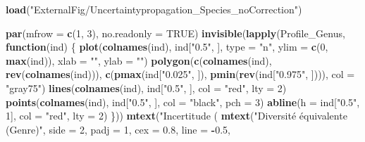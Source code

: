 \documentclass[
  11pt,
  french,
  A4paper,
  extrafontsizes,onecolumn,openright
  ]{memoir}
\newenvironment{Shaded}{\begin{snugshade}}{\end{snugshade}}
\newcommand{\KeywordTok}[1]{\textcolor[rgb]{0.13,0.29,0.53}{\textbf{#1}}}
\newcommand{\DataTypeTok}[1]{\textcolor[rgb]{0.13,0.29,0.53}{#1}}
\newcommand{\DecValTok}[1]{\textcolor[rgb]{0.00,0.00,0.81}{#1}}
\newcommand{\FloatTok}[1]{\textcolor[rgb]{0.00,0.00,0.81}{#1}}
\newcommand{\StringTok}[1]{\textcolor[rgb]{0.31,0.60,0.02}{#1}}
\newcommand{\OtherTok}[1]{\textcolor[rgb]{0.56,0.35,0.01}{#1}}
\newcommand{\ControlFlowTok}[1]{\textcolor[rgb]{0.13,0.29,0.53}{\textbf{#1}}}
\newcommand{\OperatorTok}[1]{\textcolor[rgb]{0.81,0.36,0.00}{\textbf{#1}}}
\newcommand{\NormalTok}[1]{#1}
\begin{document}
\begin{Shaded}
\begin{Highlighting}[]
\KeywordTok{load}\NormalTok{(}\StringTok{"ExternalFig/Uncertaintypropagation_Species_noCorrection"}\NormalTok{)}

\KeywordTok{par}\NormalTok{(}\DataTypeTok{mfrow =} \KeywordTok{c}\NormalTok{(}\DecValTok{1}\NormalTok{, }\DecValTok{3}\NormalTok{), }\DataTypeTok{no.readonly =} \OtherTok{TRUE}\NormalTok{)}
\KeywordTok{invisible}\NormalTok{(}\KeywordTok{lapply}\NormalTok{(Profile_Genus, }\ControlFlowTok{function}\NormalTok{(ind) \{}
    \KeywordTok{plot}\NormalTok{(}\KeywordTok{colnames}\NormalTok{(ind), ind[}\StringTok{"0.5"}\NormalTok{, ], }\DataTypeTok{type =} \StringTok{"n"}\NormalTok{, }\DataTypeTok{ylim =} \KeywordTok{c}\NormalTok{(}\DecValTok{0}\NormalTok{, }\KeywordTok{max}\NormalTok{(ind)), }\DataTypeTok{xlab =} \StringTok{""}\NormalTok{, }
        \DataTypeTok{ylab =} \StringTok{""}\NormalTok{)}
    \KeywordTok{polygon}\NormalTok{(}\KeywordTok{c}\NormalTok{(}\KeywordTok{colnames}\NormalTok{(ind), }\KeywordTok{rev}\NormalTok{(}\KeywordTok{colnames}\NormalTok{(ind))), }\KeywordTok{c}\NormalTok{(}\KeywordTok{pmax}\NormalTok{(ind[}\StringTok{"0.025"}\NormalTok{, ]), }\KeywordTok{pmin}\NormalTok{(}\KeywordTok{rev}\NormalTok{(ind[}\StringTok{"0.975"}\NormalTok{, }
\NormalTok{        ]))), }\DataTypeTok{col =} \StringTok{"gray75"}\NormalTok{)}
    \KeywordTok{lines}\NormalTok{(}\KeywordTok{colnames}\NormalTok{(ind), ind[}\StringTok{"0.5"}\NormalTok{, ], }\DataTypeTok{col =} \StringTok{"red"}\NormalTok{, }\DataTypeTok{lty =} \DecValTok{2}\NormalTok{)}
    \KeywordTok{points}\NormalTok{(}\KeywordTok{colnames}\NormalTok{(ind), ind[}\StringTok{"0.5"}\NormalTok{, ], }\DataTypeTok{col =} \StringTok{"black"}\NormalTok{, }\DataTypeTok{pch =} \DecValTok{3}\NormalTok{)}
    \KeywordTok{abline}\NormalTok{(}\DataTypeTok{h =}\NormalTok{ ind[}\StringTok{"0.5"}\NormalTok{, }\DecValTok{1}\NormalTok{], }\DataTypeTok{col =} \StringTok{"red"}\NormalTok{, }\DataTypeTok{lty =} \DecValTok{2}\NormalTok{)}
\NormalTok{\}))}
\KeywordTok{mtext}\NormalTok{(}\StringTok{"Incertitude (%
\KeywordTok{mtext}\NormalTok{(}\StringTok{"Diversité équivalente (Genre)"}\NormalTok{, }\DataTypeTok{side =} \DecValTok{2}\NormalTok{, }\DataTypeTok{padj =} \DecValTok{1}\NormalTok{, }\DataTypeTok{cex =} \FloatTok{0.8}\NormalTok{, }\DataTypeTok{line =} \OperatorTok{-}\FloatTok{0.5}\NormalTok{, }
}
\end{Highlighting}
\end{Shaded}
\end{document}
